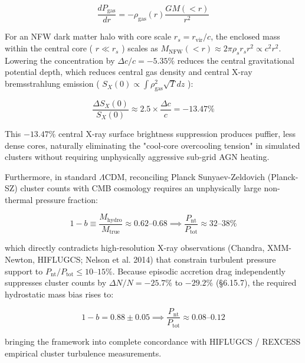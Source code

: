 \documentclass[11pt,a4paper]{article}
\theoremstyle{definition}
\theoremstyle{remark}
\begin{document}
\begin{equation}
\frac{dP_{\text{gas}}}{dr} = -\rho_{\text{gas}}(r) \frac{G M(<r)}{r^2}
\end{equation}


For an NFW dark matter halo with core scale $r_s = r_{\text{vir}} / c$, the enclosed mass within the central core ( $r \ll r_s$ ) scales as $M_{\text{NFW}}(<r) \approx 2\pi \rho_s r_s r^2 \propto c^2 r^2$. Lowering the concentration by $\Delta c/c = -5.35\%$ reduces the central gravitational potential depth, which reduces central gas density and central X-ray bremsstrahlung emission ( $S_X(0) \propto \int \rho_{\text{gas}}^2 \sqrt{T} dz$ ):


\begin{equation}
\frac{\Delta S_X(0)}{S_X(0)} \approx 2.5 \times \frac{\Delta c}{c} = \mathbf{-13.47\%}
\end{equation}


This $-13.47\%$ central X-ray surface brightness suppression produces puffier, less dense cores, naturally eliminating the "cool-core overcooling tension" in simulated clusters without requiring unphysically aggressive sub-grid AGN heating.

Furthermore, in standard $\Lambda\text{CDM}$, reconciling Planck Sunyaev-Zeldovich (Planck-SZ) cluster counts with CMB cosmology requires an unphysically large non-thermal pressure fraction:


\begin{equation}
1 - b \equiv \frac{M_{\text{hydro}}}{M_{\text{true}}} \approx 0.62\text{--}0.68 \implies \frac{P_{\text{nt}}}{P_{\text{tot}}} \approx 32\text{--}38\%
\end{equation}


which directly contradicts high-resolution X-ray observations (Chandra, XMM-Newton, HIFLUGCS; Nelson et al. 2014) that constrain turbulent pressure support to $P_{\text{nt}}/P_{\text{tot}} \le 10\text{--}15\%$. Because episodic accretion drag independently suppresses cluster counts by $\Delta N/N = -25.7\%$ to $-29.2\%$ (\S 6.15.7), the required hydrostatic mass bias rises to:


\begin{equation}
\boxed{1 - b = 0.88 \pm 0.05 \implies \frac{P_{\text{nt}}}{P_{\text{tot}}} \approx 0.08\text{--}0.12}
\end{equation}


bringing the framework into complete concordance with HIFLUGCS / REXCESS empirical cluster turbulence measurements.
\end{document}
